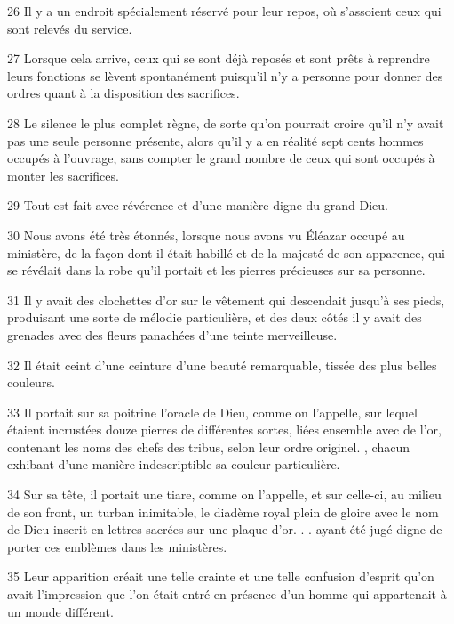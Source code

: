 \par 26 Il y a un endroit spécialement réservé pour leur repos, où s'assoient ceux qui sont relevés du service.

\par 27 Lorsque cela arrive, ceux qui se sont déjà reposés et sont prêts à reprendre leurs fonctions se lèvent spontanément puisqu'il n'y a personne pour donner des ordres quant à la disposition des sacrifices.

\par 28 Le silence le plus complet règne, de sorte qu'on pourrait croire qu'il n'y avait pas une seule personne présente, alors qu'il y a en réalité sept cents hommes occupés à l'ouvrage, sans compter le grand nombre de ceux qui sont occupés à monter les sacrifices.

\par 29 Tout est fait avec révérence et d'une manière digne du grand Dieu.

\par 30 Nous avons été très étonnés, lorsque nous avons vu Éléazar occupé au ministère, de la façon dont il était habillé et de la majesté de son apparence, qui se révélait dans la robe qu'il portait et les pierres précieuses sur sa personne.

\par 31 Il y avait des clochettes d'or sur le vêtement qui descendait jusqu'à ses pieds, produisant une sorte de mélodie particulière, et des deux côtés il y avait des grenades avec des fleurs panachées d'une teinte merveilleuse.

\par 32 Il était ceint d'une ceinture d'une beauté remarquable, tissée des plus belles couleurs.

\par 33 Il portait sur sa poitrine l'oracle de Dieu, comme on l'appelle, sur lequel étaient incrustées douze pierres de différentes sortes, liées ensemble avec de l'or, contenant les noms des chefs des tribus, selon leur ordre originel. , chacun exhibant d'une manière indescriptible sa couleur particulière.

\par 34 Sur sa tête, il portait une tiare, comme on l'appelle, et sur celle-ci, au milieu de son front, un turban inimitable, le diadème royal plein de gloire avec le nom de Dieu inscrit en lettres sacrées sur une plaque d'or. . . ayant été jugé digne de porter ces emblèmes dans les ministères.

\par 35 Leur apparition créait une telle crainte et une telle confusion d'esprit qu'on avait l'impression que l'on était entré en présence d'un homme qui appartenait à un monde différent.

